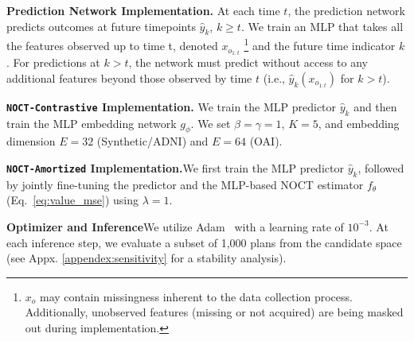 \textbf{Prediction Network Implementation.}  At each time $t$, the prediction network predicts outcomes at future timepoints $\hat{y}_k$, $k \geq t$. We train an MLP that takes all the features observed up to time t, denoted $x_{o_{1:t}}$ \footnote{$x_o$ may contain missingness inherent to the data collection process. Additionally, unobserved features (missing or not acquired) are being masked out during implementation.} and the future time indicator $k$. 
For predictions at $k > t$, the network must predict without access to any additional features beyond those observed by time $t$ (i.e., $\hat{y}_{k}(x_{o_{1:t}})$ for $k > t$). 



\textbf{\texttt{NOCT-Contrastive} Implementation.}\quad
We train the MLP predictor $\hat{y}_k$ and then train the MLP embedding network $g_\phi$. We set $\beta=\gamma=1$, $K=5$, and embedding dimension $E=32$ (Synthetic/ADNI) and $E=64$ (OAI).%


\textbf{\texttt{NOCT-Amortized} Implementation.}\quad We first train the MLP predictor $\hat{y}_k$, followed by jointly fine-tuning the predictor and the MLP-based NOCT estimator $f_{\theta}$ (Eq.~\ref{eq:value_mse}) using $\lambda=1$.%

\textbf{Optimizer and Inference}\quad We utilize Adam~\citep{kingma2014adam} with a learning rate of $10^{-3}$. At each inference step, we evaluate a subset of 1,000 plans from the 
candidate space (see Appx. \ref{appendex:sensitivity} for a stability analysis).

